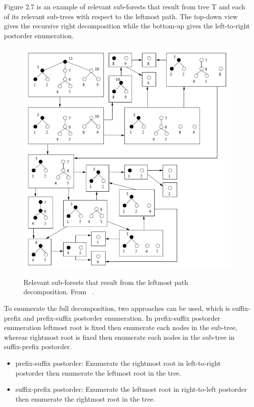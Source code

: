 Figure 2.7 is an example of relevant sub-forests that result from tree T and each of its relevant sub-trees with respect to the leftmost path. The top-down view gives the recursive right decomposition while the bottom-up gives the left-to-right postorder enumeration. 

\begin{figure}
		\centering
		\includegraphics[width=12cm,clip]{Figures/LeftToRightEnumeration}
		\label{Relevant Sub-forests that Result From the Leftmost Path Decomposition} 
		\caption{Relevant sub-forests that result from the leftmost path decomposition. From ~\cite{Chen2014}.}
\end{figure}

To enumerate the full decomposition, two approaches can be used, which is suffix-prefix and prefix-suffix postorder enumeration. In prefix-suffix postorder enumeration leftmost root is fixed then enumerate each nodes in the sub-tree, whereas rightmost root is fixed then enumerate each nodes in the sub-tree in suffix-prefix postorder. 

\begin{itemize}
\item prefix-suffix postorder: Enumerate the rightmost root in left-to-right postorder then enumerate the leftmost root in the tree. 
\item suffix-prefix postorder: Enumerate the leftmost root in right-to-left postorder then enumerate the rightmost root in the tree.
\end{itemize}

